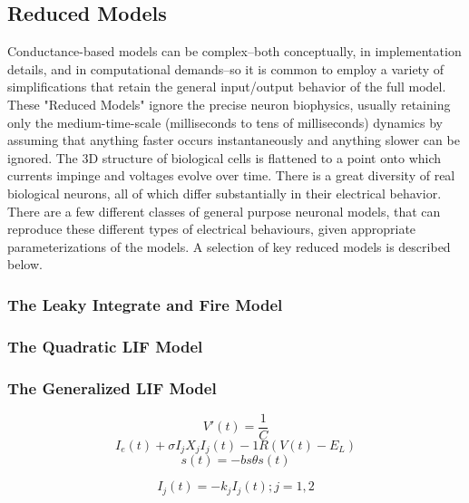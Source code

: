 \subsection{Reduced Models}
Conductance-based models can be complex--both conceptually, in implementation details, and in computational demands--so it is common to employ a variety of simplifications that retain the general input/output behavior of the full model.
These "Reduced Models" ignore the precise neuron biophysics, usually retaining only the medium-time-scale (milliseconds to tens of milliseconds) dynamics by assuming that anything faster occurs instantaneously and anything slower can be ignored.
The 3D structure of biological cells is flattened to a point onto which currents impinge and voltages evolve over time. There is a great diversity of real biological neurons, all of which differ substantially in their electrical behavior. There are a few different classes of general purpose neuronal models, that can reproduce these different types of electrical behaviours, given appropriate parameterizations of the models. A selection of key reduced models is described below.
\subsubsection{The Leaky Integrate and Fire Model}
\subsubsection{The Quadratic LIF Model}
\subsubsection{The Generalized LIF Model}

\begin{equation}
V \prime (t)=\frac{1}{C} 
\end{equation}
\begin{equation}
I_{e}(t) + \sigma I_{j}X_{j}I_{j}(t) -1R(V (t)- E_{L})  \end{equation}
\begin{equation} 
s(t) = -bs \theta s(t)  
\end{equation}

\begin{equation}
I_{j}(t) = -k_{j} I_{j} (t); j = 1, 2  
\end{equation}

